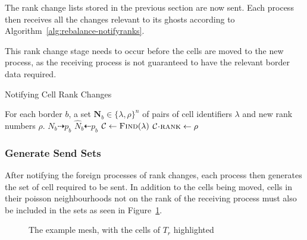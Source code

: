 \documentclass[twoside]{IIBproject}
\newcommand{\vect} [1] {\bm{#1}}
\newcommand{\dra}{\dashrightarrow}
\newcommand{\dla}{\dashleftarrow}
\newcommand{\acc}{{\mkern 0.5mu\cdot\mkern 0.5mu}}
\numberwithin{figure}{section}
\begin{document}
            The rank change lists stored in the previous section are now sent. Each process then receives all the changes relevant to its ghosts according to Algorithm~\ref{alg:rebalance-notifyranks}.

            This rank change stage needs to occur before the cells are moved to the new process, as the receiving process is not guaranteed to have the relevant border data required.

            \begin{algorithm}[H]
                \caption{Notifying Cell Rank Changes}
                \label{alg:rebalance-notifyranks}

                \begin{algorithmic}
                    \Require For each border $b$, a set $\vect{N}_b \in \{\lambda,\rho\}^n$ of pairs of cell identifiers $\lambda$ and new rank numbers $\rho$.
                    \Statex
                        \Send $N_b \dra p_b$
                    \EndFor
                    \Statex
                        \Recv $\hat N_b \dla p_b$
                            \State $\mathcal{C}\gets\textproc{Find}(\lambda)$
                            \State $\mathcal{C}\acc\textproc{rank} \gets \rho$
                        \EndFor
                    \EndFor
                \end{algorithmic}
            \end{algorithm}



        \subsubsection{Generate Send Sets} %
            \label{sec:rebalancing-gensendset}

            After notifying the foreign processes of rank changes, each process then generates the set of cell required to be sent. In addition to the cells being moved, cells in their poisson neighbourhoods not on the rank of the receiving process must also be included in the sets as seen in Figure~\ref{fig:rebalance-transfer}.

            \begin{figure}[H]
                
                \caption{The example mesh, with the cells of $T_r$ highlighted}
                \label{fig:rebalance-transfer}
            \end{figure}
\end{document}

